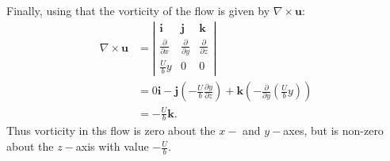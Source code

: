 \documentclass{article}
\begin{document}
\begin{itemize}
    
    Finally, using that the vorticity of the flow is given by $\nabla \times \mathbf{u}$:
    \begin{align*}
        \nabla \times \mathbf{u} &= \left|\begin{matrix}
            \mathbf{i} & \mathbf{j} & \mathbf{k}\\
            \frac{\partial }{\partial x} & \frac{\partial}{\partial y} & \frac{\partial}{\partial z}\\
            \frac{U}{b}y & 0 & 0
        \end{matrix}\right|\\
        &= 0\mathbf{i} - \mathbf{j}\left(-\frac{U}{b}\frac{\partial y}{\partial z}\right) + \mathbf{k}\left(-\frac{\partial }{\partial y}\left(\frac{U}{b}y\right)\right)\\
        &= -\frac{U}b{\mathbf{k}}.
    \end{align*}
    Thus vorticity in ths flow is zero about the $x-$ and $y-$axes, but is non-zero about the $z-$axis with value $-\frac{U}{b}$.



\end{itemize}
\end{document}

